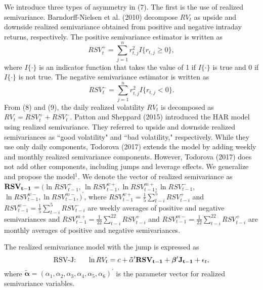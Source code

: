 \documentclass[10pt]{article}
\begin{document}
We introduce three types of asymmetry in (7).  
The first is the use of realized semivariance. 
Barndorff-Nielsen et al. (2010) decompose $RV_t$ as upside and downside realized semivariance obtained from positive and negative intraday returns, respectively. 
The positive semivariance estimator is written as
\begin{equation}
RSV_t^{+}=\sum_{j=1}^n r_{t,j}^2 I\{r_{t,j} \ge 0 \},  
\end{equation}
where $I\{\cdot\}$ is an indicator function that takes the value of 1 if $I\{\cdot\}$ is true and 0 if $I\{\cdot\}$ is not true. 
The negative semivariance estimator is written as 
\begin{equation}
RSV_t^{-}=\sum_{j=1}^n r_{t,j}^2 I\{r_{t,j} < 0 \}. 
\end{equation}
From (8) and (9), the daily realized volatility $RV_t$ is decomposed as $RV_t=RSV_t^{+}+RSV_t^{-}$. 
Patton and Sheppard (2015) introduced the HAR model using realized semivariance. 
They referred to upside and downside realized semivariances as ``good volatility" and ``bad volatility," respectively. 
While they use only daily components, Todorova (2017) extends the model by adding weekly and monthly realized semivariance components. 
However, Todorova (2017) does not add other components, including jumps and leverage effects. 
We generalize and propose the model$^{1}$.  
We denote the vector of realized semivariance as ${\bf RSV_{t-1}}$$=(\ln RSV_{t-1}^{+}$, $\ln RSV_{t-1}^{w+}, \ln RSV_{t-1}^{m+}, \ln RSV_{t-1}^{-}$, $\ln RSV_{t-1}^{w-}, \ln RSV_{t-1}^{m-}, )^{\prime}$, 
where $RSV_{t-1}^{w+}=\frac{1}{5}\sum_{t-i}^5 RSV_{t-i}^{+}$ and $RSV_{t-1}^{w-}=\frac{1}{5}\sum_{t-i}^5 RSV_{t-i}^{-}$ are weekly averages of positive and negative semivariances 
and $RSV_{t-1}^{m+}=\frac{1}{22}\sum_{t-i}^{22} RSV_{t-i}^{+}$ and $RSV_{t-1}^{m-}=\frac{1}{22}\sum_{t-i}^{22} RSV_{t-i}^{+}$ are monthly averages of positive and negative semivariances. 

The realized semivariance model with the jump is expressed as 
\begin{equation}
\text{RSV-J:} \ \ \ \ \ \ln RV_t=c+{\boldsymbol  \tilde{\alpha}}^{\prime} {\bf RSV_{t-1}} +{\boldsymbol  \beta}^{\prime} {\bf J_{t-1}} +\epsilon_t, 
\end{equation}
where ${\boldsymbol  \tilde{\alpha}}=(\alpha_1, \alpha_2, \alpha_3, \alpha_4, \alpha_5, \alpha_6)^{\prime}$ is the parameter vector for realized semivariance variables. 
\end{document}
